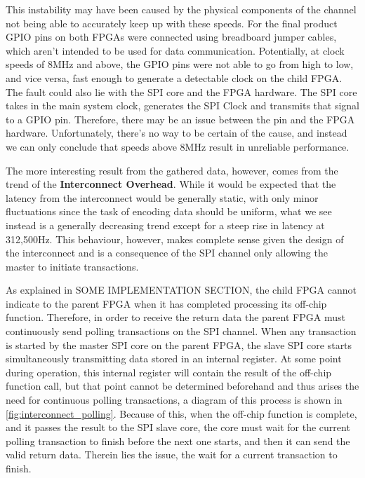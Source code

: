 This instability may have been caused by the physical components of the channel not being able to accurately keep up with these speeds. For the final product GPIO pins on both FPGAs were connected using breadboard jumper cables, which aren't intended to be used for data communication. Potentially, at clock speeds of 8MHz and above, the GPIO pins were not able to go from high to low, and vice versa, fast enough to generate a detectable clock on the child FPGA. The fault could also lie with the SPI core and the FPGA hardware. The SPI core takes in the main system clock, generates the SPI Clock and transmits that signal to a GPIO pin. Therefore, there may be an issue between the pin and the FPGA hardware. Unfortunately, there's no way to be certain of the cause, and instead we can only conclude that speeds above 8MHz result in unreliable performance. 

The more interesting result from the gathered data, however, comes from the trend of the \textbf{Interconnect Overhead}. While it would be expected that the latency from the interconnect would be generally static, with only minor fluctuations since the task of encoding data should be uniform, what we see instead is a generally decreasing trend except for a steep rise in latency at 312,500Hz. This behaviour, however, makes complete sense given the design of the interconnect and is a consequence of the SPI channel only allowing the master to initiate transactions. 

As explained in SOME IMPLEMENTATION SECTION, the child FPGA cannot indicate to the parent FPGA when it has completed processing its off-chip function. Therefore, in order to receive the return data the parent FPGA must continuously send polling transactions on the SPI channel. When any transaction is started by the master SPI core on the parent FPGA, the slave SPI core starts simultaneously transmitting data stored in an internal register. At some point during operation, this internal register will contain the result of the off-chip function call, but that point cannot be determined beforehand and thus arises the need for continuous polling transactions, a diagram of this process is shown in \autoref{fig:interconnect_polling}. Because of this, when the off-chip function is complete, and it passes the result to the SPI slave core, the core must wait for the current polling transaction to finish before the next one starts, and then it can send the valid return data. Therein lies the issue, the wait for a current transaction to finish.

